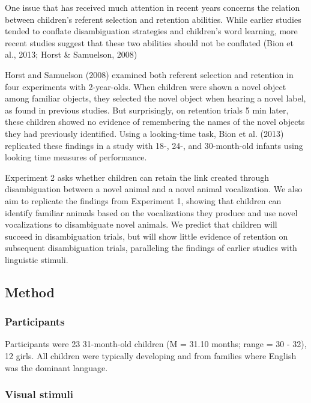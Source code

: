 \documentclass[english,floatsintext,man]{apa6}
\theoremstyle{definition}
\theoremstyle{definition}
\theoremstyle{definition}
\theoremstyle{remark}
\begin{document}
One issue that has received much attention in recent years concerns the
relation between children's referent selection and retention abilities.
While earlier studies tended to conflate disambiguation strategies and
children's word learning, more recent studies suggest that these two
abilities should not be conflated (Bion et al., 2013; Horst \&
Samuelson, 2008)

Horst and Samuelson (2008) examined both referent selection and
retention in four experiments with 2-year-olds. When children were shown
a novel object among familiar objects, they selected the novel object
when hearing a novel label, as found in previous studies. But
surprisingly, on retention trials 5 min later, these children showed no
evidence of remembering the names of the novel objects they had
previously identified. Using a looking-time task, Bion et al. (2013)
replicated these findings in a study with 18-, 24-, and 30-month-old
infants using looking time measures of performance.

Experiment 2 asks whether children can retain the link created through
disambiguation between a novel animal and a novel animal vocalization.
We also aim to replicate the findings from Experiment 1, showing that
children can identify familiar animals based on the vocalizations they
produce and use novel vocalizations to disambiguate novel animals. We
predict that children will succeed in disambiguation trials, but will
show little evidence of retention on subsequent disambiguation trials,
paralleling the findings of earlier studies with linguistic stimuli.

\hypertarget{method-1}{%
\subsection{Method}\label{method-1}}

\hypertarget{participants-1}{%
\subsubsection{Participants}\label{participants-1}}

Participants were 23 31-month-old children (M = 31.10 months; range = 30
- 32), 12 girls. All children were typically developing and from
families where English was the dominant language.

\hypertarget{visual-stimuli-1}{%
\subsubsection{Visual stimuli}\label{visual-stimuli-1}}
\end{document}
